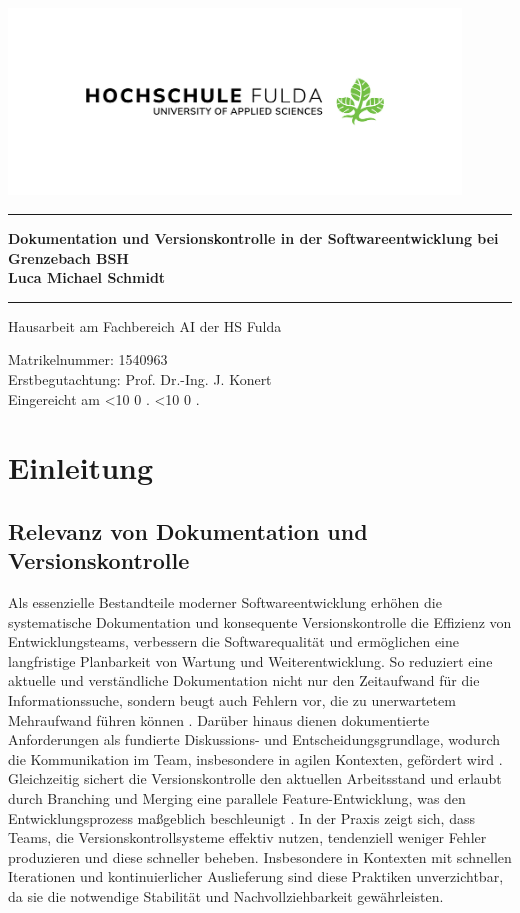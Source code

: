\documentclass[12pt,oneside]{article}
\newcommand{\todayddmmyyyy}{%
    \ifnum
        \day<10 0
    \fi\the\day.%
    \ifnum
        \month<10 0
    \fi\the\month.%
    \the\year}
\newcommand{\HSFTitle}[8]{

    \thispagestyle{empty}
    \begin{center}
    \includegraphics[width=0.9\textwidth]{logo_new_2.png} \\
    \vspace*{\stretch{1}}
    \end{center}

    {\parindent0cm
    \rule{\linewidth}{.7ex}}
    \begin{center}
    \vspace*{\stretch{1}}
    \sffamily\bfseries\Huge
    #1\\
    \vspace*{\stretch{1}}
    \sffamily\bfseries\large
    #3
    \vspace*{\stretch{1}}
    \end{center}
    \rule{\linewidth}{.7ex}

    \vspace*{\stretch{2}}
    \begin{center}
    \Large #2 am #5 der HS Fulda \\
    \vspace*{\stretch{1}}

    \large Matrikelnummer: #4 \\[1mm]
    \large Erstbegutachtung: #7 \\[1mm]

    \vspace*{\stretch{1}}
    \large Eingereicht am #6
    \end{center}
}
\begin{document}
    \HSFTitle
    {Dokumentation und Versionskontrolle in der Softwareentwicklung bei Grenzebach BSH}        %
    {Hausarbeit} %
    {Luca Michael Schmidt}          %
    {1540963}
    {Fachbereich AI}  %
    {\todayddmmyyyy}        %
    {Prof. Dr.-Ing. J. Konert}     %

    \clearpage

    \lhead{}
    \setcounter{page}{1}

    

    \clearpage
    \tableofcontents
    \clearpage

    \listoffigures
    \clearpage


    \cleardoublepage
    \setcounter{page}{1}
    \lhead{\nouppercase{\leftmark}}




    \section{Einleitung}
    \label{sec:einleitung}

    \subsection{Relevanz von Dokumentation und Versionskontrolle}
    \label{subsec:relevanz}
    Als essenzielle Bestandteile moderner Softwareentwicklung erhöhen die systematische Dokumentation und konsequente Versionskontrolle die Effizienz von Entwicklungsteams, verbessern die Softwarequalität und ermöglichen eine langfristige Planbarkeit von Wartung und Weiterentwicklung. So reduziert eine aktuelle und verständliche Dokumentation nicht nur den Zeitaufwand für die Informationssuche, sondern beugt auch Fehlern vor, die zu unerwartetem Mehraufwand führen können \cite{webmakers2024}. Darüber hinaus dienen dokumentierte Anforderungen als fundierte Diskussions- und Entscheidungsgrundlage, wodurch die Kommunikation im Team, insbesondere in agilen Kontexten, gefördert wird \cite{fraunhoferIESE2020}. Gleichzeitig sichert die Versionskontrolle den aktuellen Arbeitsstand und erlaubt durch Branching und Merging eine parallele Feature-Entwicklung, was den Entwicklungsprozess maßgeblich beschleunigt \cite{moldstud2024}. In der Praxis zeigt sich, dass Teams, die Versionskontrollsysteme effektiv nutzen, tendenziell weniger Fehler produzieren und diese schneller beheben. Insbesondere in Kontexten mit schnellen Iterationen und kontinuierlicher Auslieferung sind diese Praktiken unverzichtbar, da sie die notwendige Stabilität und Nachvollziehbarkeit gewährleisten.
\end{document}
